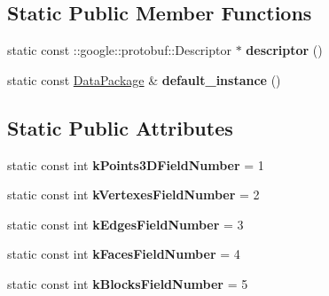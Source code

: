 \subsection*{Static Public Member Functions}
\begin{DoxyCompactItemize}
\item 
\hypertarget{classstruct_definitions_1_1_data_package_aeabdd386830719a0d35224bda5b83b77}{}\label{classstruct_definitions_1_1_data_package_aeabdd386830719a0d35224bda5b83b77} 
static const \+::google\+::protobuf\+::\+Descriptor $\ast$ {\bfseries descriptor} ()
\item 
\hypertarget{classstruct_definitions_1_1_data_package_ae90f71ff6ea9a63e667b6a0137beabdf}{}\label{classstruct_definitions_1_1_data_package_ae90f71ff6ea9a63e667b6a0137beabdf} 
static const \hyperlink{classstruct_definitions_1_1_data_package}{Data\+Package} \& {\bfseries default\+\_\+instance} ()
\end{DoxyCompactItemize}
\subsection*{Static Public Attributes}
\begin{DoxyCompactItemize}
\item 
\hypertarget{classstruct_definitions_1_1_data_package_a5380fdedfadd3e28cfee1a94d9a43a67}{}\label{classstruct_definitions_1_1_data_package_a5380fdedfadd3e28cfee1a94d9a43a67} 
static const int {\bfseries k\+Points3\+D\+Field\+Number} = 1
\item 
\hypertarget{classstruct_definitions_1_1_data_package_a03c398411a6f7bff751df5d629ea415d}{}\label{classstruct_definitions_1_1_data_package_a03c398411a6f7bff751df5d629ea415d} 
static const int {\bfseries k\+Vertexes\+Field\+Number} = 2
\item 
\hypertarget{classstruct_definitions_1_1_data_package_ada08d9786f9ca7b87d9b712b0d6b719a}{}\label{classstruct_definitions_1_1_data_package_ada08d9786f9ca7b87d9b712b0d6b719a} 
static const int {\bfseries k\+Edges\+Field\+Number} = 3
\item 
\hypertarget{classstruct_definitions_1_1_data_package_a450c772cf269766a221061d1a5b362e2}{}\label{classstruct_definitions_1_1_data_package_a450c772cf269766a221061d1a5b362e2} 
static const int {\bfseries k\+Faces\+Field\+Number} = 4
\item 
\hypertarget{classstruct_definitions_1_1_data_package_a50ef9563360937b5f46a97f6162bcd81}{}\label{classstruct_definitions_1_1_data_package_a50ef9563360937b5f46a97f6162bcd81} 
static const int {\bfseries k\+Blocks\+Field\+Number} = 5
\end{DoxyCompactItemize}
